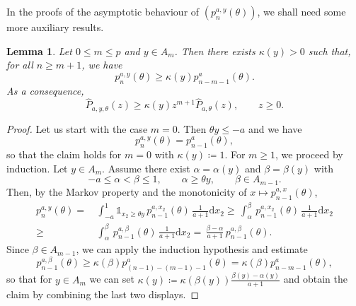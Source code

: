 \documentclass[12pt]{article}
\newcommand{\1}{\mathds{1}}
\renewcommand{\d}{\mathrm{d}}
\theoremstyle{definition}
\theoremstyle{plain}
\newtheorem{Lemma}[definition]{Lemma}
\theoremstyle{remark}
\begin{document}
In the proofs of the asymptotic behaviour of  $(p_n^{a,y}(\theta))$, we shall need some more auxiliary results. 


\begin{Lemma}\label{orange_aux_lemma_p_n} Let $0\leq m\leq p$ and $y\in A_m$. Then there exists $\kappa(y)>0$ such that, for all $n\geq m+1$, we have
$$
p_n^{a,y}(\theta) \geq \kappa(y) p_{n-m-1}^a(\theta).
$$
As a consequence,
$$
\hat P_{a,y,\theta}(z) 
\geq \kappa(y) z^{m+1} \hat P_{a,\theta}(z),\qquad z\geq 0.
$$
\end{Lemma}

\begin{proof} %
Let us start with the case $m=0$. Then $\theta y\leq -a$ and we have
$$
p_n^{a,y}(\theta) = p_{n-1}^a(\theta),
$$
so that the claim holds for $m=0$ with $\kappa(y)\coloneqq 1$. For $m\geq 1$, we proceed by induction. Let $y\in A_m$. Assume there exist $\alpha=\alpha(y)$ and $\beta=\beta(y)$ with
\begin{equation} \label{eqn:choicealphabeta}
-a\leq \alpha < \beta \leq 1, \qquad \alpha\geq \theta y, \qquad \beta \in A_{m-1}.
\end{equation}
Then, by the Markov property and the monotonicity of $x\mapsto p_{n-1}^{a,x}(\theta)$,
\begin{align*}
p_n^{a,y}(\theta)
 = & \, \int_{-a}^1 \1_{x_2\geq \theta y} \, p_{n-1}^{a,x_2}(\theta) \, \frac{1}{a+1}\d x_2
\geq  \, \int_{\alpha}^\beta \, p_{n-1}^{a,x_2}(\theta) \, \frac{1}{a+1}\d x_2
\\\geq & \, \int_{\alpha}^\beta \, p_{n-1}^{a,\beta}(\theta) \, \frac{1}{a+1}\d x_2
=  \, \frac{\beta-\alpha}{a+1}\, p_{n-1}^{a,\beta}(\theta).
\end{align*}
Since $\beta\in A_{m-1}$, we can apply the induction hypothesis and estimate 
$$
p_{n-1}^{a,\beta}(\theta)\geq \kappa(\beta) p_{(n-1)-(m-1)-1}^a(\theta)=\kappa(\beta) p_{n-m-1}^a(\theta),
$$
so that for $y\in A_m$ we can set $\kappa(y)\coloneqq \kappa(\beta(y)) \frac{\beta(y)-\alpha(y)}{a+1}$ and obtain the claim by combining the last two displays.


\end{proof}
\end{document}
